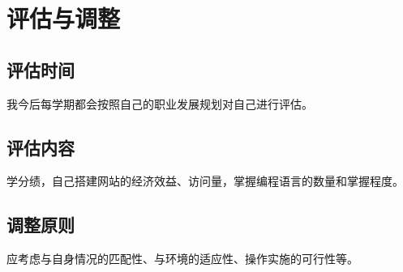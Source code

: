 \documentclass{article}
\begin{document}
\section{评估与调整}

\subsection{评估时间}
我今后每学期都会按照自己的职业发展规划对自己进行评估。\par
\subsection{评估内容}
学分绩，自己搭建网站的经济效益、访问量，掌握编程语言的数量和掌握程度。
\par
\subsection{调整原则}
应考虑与自身情况的匹配性、与环境的适应性、操作实施的可行性等。\par



\end{document}
